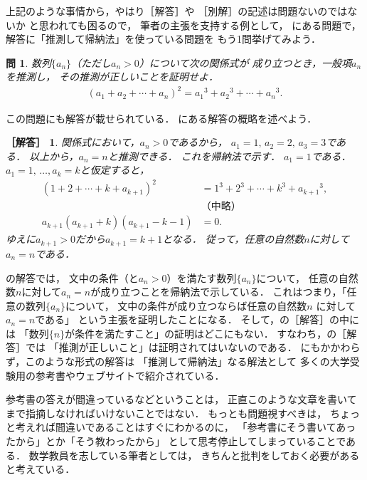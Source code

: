 \documentclass[11pt,a4paper]{ltjsarticle} %
\theoremstyle{mystyle} %
\newtheorem{que}{問} %
\newtheorem*{ans}{［解答］} %
\begin{document}
上記のような事情から，やはり［解答］や
［別解］の記述は問題ないのではないか
と思われても困るので，
筆者の主張を支持する例として，
\cite{chert}にある問題で，解答に「推測して帰納法」を使っている問題を
もう1問挙げてみよう．
\begin{que} \label{que:suisokuchert2}
	数列$\{ a_n \}$（ただし$a_n > 0$）について次の関係式が
	成り立つとき，一般項$a_n$を推測し，
	その推測が正しいことを証明せよ．
	\begin{align}
		( a_1 + a_2 + \cdots + a_n )^2 =
		{a_1} ^3 + {a_2} ^3 + \cdots + {a_n } ^3 .
		\label{eq:suisoku2}
	\end{align}
\end{que}

この問題にも解答が載せられている．
\cite{chert}にある解答の概略を述べよう．

\begin{ans}
	関係式において，$a_n > 0$であるから，
	$a_1=1, \, a_2=2, \, a_3=3$である．
	以上から，$a_n = n$と推測できる．
	これを帰納法で示す．
	$a_1 = 1$である．
	$a_1=1, \, \ldots, a_k = k$と仮定すると，
	\begin{align*}
		(1+2+ \cdots + k + a_{k+1})^2          & = 1^3 + 2^3 + \cdots + k^3 + {a_{k+1}} ^3, \\
		                                       & \text{（中略）}                            \\
		a_{k+1}(a_{k+1} + k) (a_{k+1} - k - 1) & = 0.
	\end{align*}
	ゆえに$a_{k+1} > 0$だから$a_{k+1} = k+1$となる．
	従って，任意の自然数$n$に対して$a_n = n$である．
\end{ans}



の解答では，
文中の条件（と$a_n > 0$）を満たす数列$\{ a_n \}$について，
任意の自然数$n$に対して$a_n = n$が成り立つことを帰納法で示している．
これはつまり，「任意の数列$\{ a_n \}$について，
文中の条件が成り立つならば任意の自然数$n$
に対して$a_n = n$である」
という主張を証明したことになる．
そして，の［解答］の中には
「数列$\{ n \}$が条件を満たすこと」の証明はどこにもない．
すなわち，の［解答］では
「推測が正しいこと」は証明されてはいないのである．
にもかかわらず，このような形式の解答は
「推測して帰納法」なる解法として
多くの大学受験用の参考書やウェブサイトで紹介されている．

参考書の答えが間違っているなどということは，
正直このような文章を書いてまで指摘しなければいけないことではない．
もっとも問題視すべきは，
ちょっと考えれば間違いであることはすぐにわかるのに，
「参考書にそう書いてあったから」とか「そう教わったから」
として思考停止してしまっていることである．
数学教員を志している筆者としては，
きちんと批判をしておく必要があると考えている．
\end{document}
